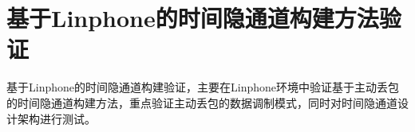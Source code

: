 \chapter{基于Linphone的时间隐通道构建方法验证}
\label{chap:linphone}

基于Linphone的时间隐通道构建验证，主要在Linphone环境中验证基于主动丢包的时间隐通道构建方法，重点验证主动丢包的数据调制模式，同时对时间隐通道设计架构进行测试。






